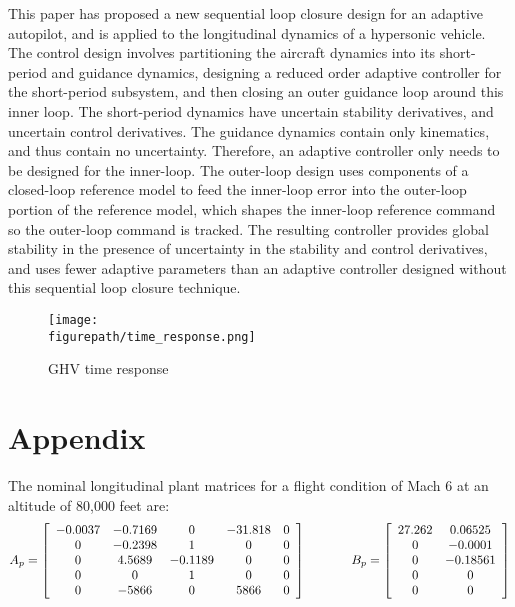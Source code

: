 \documentclass[]{../sty/aiaa-tc}
\newcommand{\figurepath}{../fig}
\theoremstyle{examplestyle}
\begin{document}
  This paper has proposed a new sequential loop closure design for an adaptive autopilot, and is applied to the longitudinal dynamics of a hypersonic vehicle.
  The control design involves partitioning the aircraft dynamics into its short-period and guidance dynamics, designing a reduced order adaptive controller for the short-period subsystem, and then closing an outer guidance loop around this inner loop.
  The short-period dynamics have uncertain stability derivatives, and uncertain control derivatives.
  The guidance dynamics contain only kinematics, and thus contain no uncertainty.
  Therefore, an adaptive controller only needs to be designed for the inner-loop.
  The outer-loop design uses components of a closed-loop reference model to feed the inner-loop error into the outer-loop portion of the reference model, which shapes the inner-loop reference command so the outer-loop command is tracked.
  The resulting controller provides global stability in the presence of uncertainty in the stability and control derivatives, and uses fewer adaptive parameters than an adaptive controller designed without this sequential loop closure technique.

  \begin{figure}[H]
    \begin{center}
      \texttt{[image: \\figurepath/time\_response.png]}
      \caption{GHV time response\label{fig.time_response_1}}
    \end{center}
  \end{figure}

  \section*{Appendix}\label{sec.appendix}

  The nominal longitudinal plant matrices for a flight condition of Mach 6 at an altitude of 80,000 feet are:
  \begin{equation*}
    A_{p}=
    \left[
    \begin{array}{ccccc}
      -0.0037 & -0.7169 & 0 & -31.818 & 0 \\
      0 & -0.2398 & 1 & 0 & 0 \\
      0 & 4.5689 & -0.1189 & 0 & 0 \\
      0 & 0 & 1 & 0 & 0 \\
      0 & -5866 & 0 & 5866 & 0 \\
    \end{array}\right]
    \hspace{0.5in}
    B_{p}=
    \left[
    \begin{array}{cc}
      27.262 & 0.06525 \\
      0 & -0.0001 \\
      0 & -0.18561 \\
      0 & 0 \\
      0 & 0 \\
    \end{array}\right]
  \end{equation*}
\end{document}
